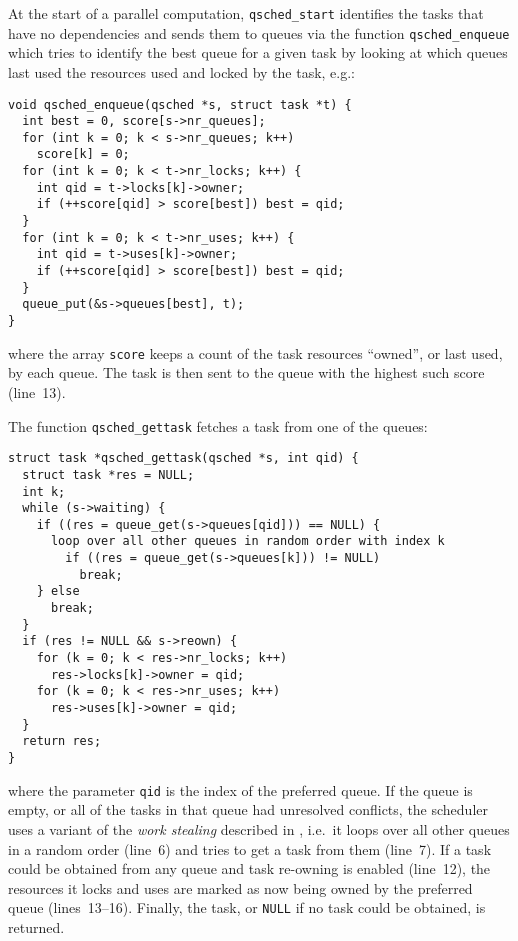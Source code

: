 \documentclass[fleqn,10pt]{wlpeerj}
\begin{document}
At the start of a parallel computation, {\tt qsched\_start}
identifies the tasks that have no dependencies and sends them
to queues via the function {\tt qsched\_enqueue} which
tries to identify the best
queue for a given task by looking at which queues last used
the resources used and locked by the task, e.g.:
\begin{center}\begin{minipage}{0.9\textwidth}
    \begin{lstlisting}
void qsched_enqueue(qsched *s, struct task *t) {
  int best = 0, score[s->nr_queues];
  for (int k = 0; k < s->nr_queues; k++)
    score[k] = 0;
  for (int k = 0; k < t->nr_locks; k++) {
    int qid = t->locks[k]->owner;
    if (++score[qid] > score[best]) best = qid;
  }
  for (int k = 0; k < t->nr_uses; k++) {
    int qid = t->uses[k]->owner;
    if (++score[qid] > score[best]) best = qid;
  }
  queue_put(&s->queues[best], t);
}
    \end{lstlisting}
\end{minipage}\end{center}
\noindent where the array {\tt score} keeps a count of the
task resources ``owned'', or last used, by each queue.
The task is then sent to the queue with the highest such score
(line~13).

The function {\tt qsched\_gettask} fetches a task from
one of the queues:
\begin{center}\begin{minipage}{0.9\textwidth}
    \begin{lstlisting}
struct task *qsched_gettask(qsched *s, int qid) {
  struct task *res = NULL;
  int k;
  while (s->waiting) {
    if ((res = queue_get(s->queues[qid])) == NULL) {
      loop over all other queues in random order with index k
        if ((res = queue_get(s->queues[k])) != NULL)
          break;
    } else
      break;
  }
  if (res != NULL && s->reown) {
    for (k = 0; k < res->nr_locks; k++)
      res->locks[k]->owner = qid;
    for (k = 0; k < res->nr_uses; k++)
      res->uses[k]->owner = qid;
  }
  return res;
}
    \end{lstlisting}
\end{minipage}\end{center}
\noindent where the parameter {\tt qid} is the index of the
preferred queue.
If the queue is empty, or all of the tasks in that queue had
unresolved conflicts, the scheduler uses a variant of the
{\em work stealing} described in \cite{ref:Blumofe1999},
i.e.~it loops over all other queues
in a random order (line~6) and tries to get a task from them
(line~7).
If a task could be obtained from any queue and task re-owning
is enabled (line~12),
the resources it locks and uses are marked as now being owned
by the preferred queue (lines~13--16).
Finally, the task, or {\tt NULL} if no task could be obtained,
is returned.
\end{document}
